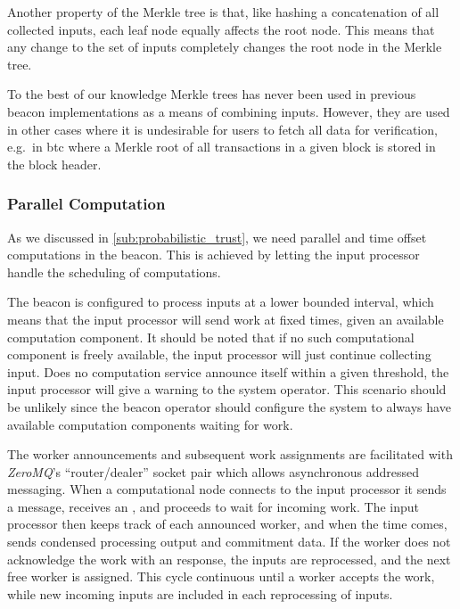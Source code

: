 Another property of the Merkle tree is that, like hashing a concatenation of all collected inputs, each leaf node equally affects the root node.
This means that any change to the set of inputs completely changes the root node in the Merkle tree.

To the best of our knowledge Merkle trees has never been used in previous beacon implementations as a means of combining inputs.
However, they are used in other cases where it is undesirable for users to fetch all data for verification, e.g.\ in \gls{btc} where a Merkle root of all transactions in a given block is stored in the block header.

\subsubsection{Parallel Computation}%
\label{ssub:parallel_computation}
As we discussed in \cref{sub:probabilistic_trust}, we need parallel and time offset computations in the beacon.
This is achieved by letting the input processor handle the scheduling of computations.

The beacon is configured to process inputs at a lower bounded interval, which means that the input processor will send work at fixed times, given an available computation component.
It should be noted that if no such computational component is freely available, the input processor will just continue collecting input.
Does no computation service announce itself within a given threshold, the input processor will give a warning to the system operator.
This scenario should be unlikely since the beacon operator should configure the system to always have available computation components waiting for work.

The worker announcements and subsequent work assignments are facilitated with \textit{ZeroMQ}'s \enquote{router/dealer} socket pair which allows asynchronous addressed messaging.
When a computational node connects to the input processor it sends a  message, receives an , and proceeds to wait for incoming work.
The input processor then keeps track of each announced worker, and when the time comes, sends condensed processing output and commitment data.
If the worker does not acknowledge the work with an  response, the inputs are reprocessed, and the next free worker is assigned.
This cycle continuous until a worker accepts the work, while new incoming inputs are included in each reprocessing of inputs.

